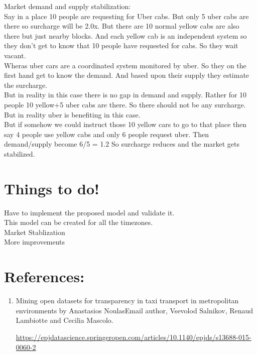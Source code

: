 \documentclass{article}
\begin{document}
Market demand and supply stabilization:
\\Say in a place 10 people are requesting for Uber cabs. But only 5 uber cabs are there so surcharge will be 2.0x. But there are 10 normal yellow cabs are also there but just nearby blocks. And each yellow cab is an independent system so they don’t get to know that 10 people have requested for cabs. So they wait vacant. 
\\Wheras uber cars are a coordinated system monitored by uber. So they on the first hand get to know the demand. And based upon their supply they estimate the surcharge.
\\But in reality in this case there is no gap in demand and supply. Rather  for 10 people 10 yellow+5 uber cabs are there. So there should not be any surcharge.  But in reality uber is benefiting in this case. 
\\But if somehow we could instruct those 10 yellow cars to go to that place then say 4 people use yellow cabs and only 6 people request uber. Then demand/supply become 6/5 = 1.2
So surcharge reduces and the market gets stabilized. 


\section{Things to do!}

Have to implement the proposed model and validate it.
\\This model can be created for all the timezones.
\\ Market Stablization
\\ More improvements

\pagebreak
\section{References:}
\begin{enumerate}
\item Mining open datasets for transparency in taxi transport in metropolitan environments by Anastasios NoulasEmail author, Vsevolod Salnikov, Renaud Lambiotte and Cecilia Mascolo.

\url{https://epjdatascience.springeropen.com/articles/10.1140/epjds/s13688-015-0060-2}
\end{enumerate}
\end{document}
